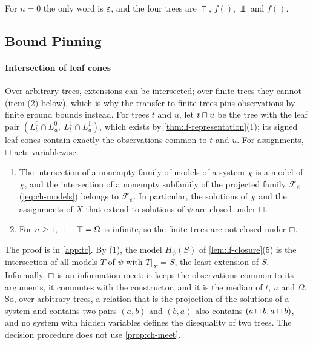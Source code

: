 For $n=0$ the only word is $\varepsilon$, and the four trees are $\Top$, $f()$,
$\Bot$ and $f()$.

\subsection{Bound Pinning}\label{sec:tc-pinning}

\paragraph{Intersection of leaf cones}
Over arbitrary trees, extensions can be intersected; over finite trees they
cannot (item (2) below), which is why the transfer to finite trees pins
observations by finite ground bounds instead. For trees $t$ and $u$, let
$t\sqcap u$ be the tree with the leaf pair
$(L^0_t\cap L^0_u,\ L^1_t\cap L^1_u)$, which exists by
\cref{thm:lf-representation}(1); its signed leaf cones contain exactly the
observations common to $t$ and $u$. For assignments, $\sqcap$ acts variablewise.

\begin{proposition}\label{prop:ch-meet}
\leavevmode
\begin{enumerate}[leftmargin=*]
\item The intersection of a nonempty family of models of a system $\chi$ is a
  model of $\chi$, and the intersection of a nonempty subfamily of the
  projected family $\mathcal F_\psi$ (\cref{eq:ch-models}) belongs to
  $\mathcal F_\psi$. In particular, the solutions of $\chi$ and the assignments of $X$ that extend
  to solutions of $\psi$ are closed under $\sqcap$.
\item For $n\ge1$, $\bot\sqcap\top=\Omega$ is infinite, so the finite trees
  are not closed under $\sqcap$.
\end{enumerate}
\end{proposition}

The proof is in \cref{app:tc}. By (1), the model $H_\psi(S)$ of
\cref{lem:lf-closure}(5) is the intersection of all models $T$ of $\psi$ with
$T|_X=S$, the least extension of $S$. Informally, $\sqcap$ is an
information meet: it keeps the observations common to its arguments, it
commutes with the constructor, and it is the median of $t$, $u$ and $\Omega$.
So, over arbitrary trees, a relation that is the projection of the
solutions of a system and contains two pairs $(a,b)$ and $(b,a)$ also contains
$(a\sqcap b,a\sqcap b)$, and no system with hidden variables defines the
disequality of two trees. The decision procedure does not use
\cref{prop:ch-meet}.

